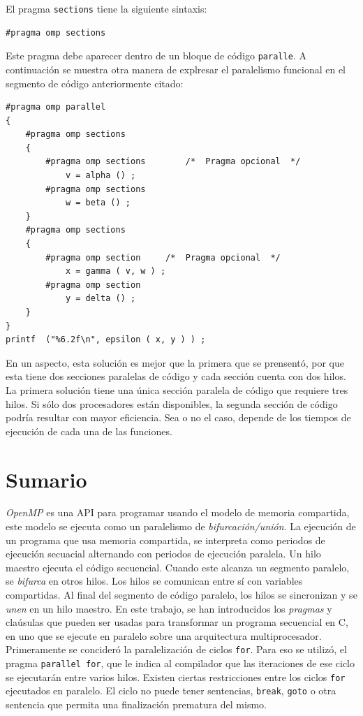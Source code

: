 \documentclass[12pt,letterpaper]{book}
\begin{document}
El pragma \texttt{sections} tiene la siguiente sintaxis:

\begin{lstlisting}[style=C]
#pragma omp sections
\end{lstlisting}

Este pragma debe aparecer dentro de un bloque de código \texttt{paralle}. A continuación se muestra otra manera de explresar el paralelismo funcional en el segmento de código anteriormente citado:

\begin{lstlisting}[style=C]
#pragma omp parallel
{
	#pragma omp sections
	{
		#pragma omp sections		/*  Pragma opcional  */
			v = alpha () ;
		#pragma omp sections
			w = beta () ;
	}
	#pragma omp sections
	{
		#pragma omp section		/*  Pragma opcional  */
			x = gamma ( v, w ) ;
		#pragma omp section
			y = delta () ;
	}
}
printf  ("%6.2f\n", epsilon ( x, y ) ) ;
\end{lstlisting}

En un aspecto, esta solución es mejor que la primera que se prensentó, por que esta tiene dos secciones paralelas de código y cada sección cuenta con dos hilos. La primera solución tiene una única sección paralela de código que requiere tres hilos. Si sólo dos procesadores están disponibles, la segunda sección de código podría resultar con mayor eficiencia. Sea o no el caso, depende de los tiempos de ejecución de cada una de las funciones.

\section{Sumario}

\textit{OpenMP} es una API para programar usando el modelo de memoria compartida, este modelo se ejecuta como un paralelismo de \textit{bifurcación/unión}. La ejecución de un programa que usa memoria compartida, se interpreta como periodos de ejecución secuacial alternando con periodos de ejecución paralela. Un hilo maestro ejecuta el código secuencial. Cuando este alcanza un segmento paralelo, se \textit{bifurca} en otros hilos. Los hilos se comunican entre sí con variables compartidas. Al final del segmento de código paralelo, los hilos se sincronizan y se \textit{unen} en un hilo maestro.
En este trabajo, se han introducidos los \textit{pragmas} y claúsulas que pueden ser usadas para transformar un programa secuencial en C, en uno que se ejecute en paralelo sobre una arquitectura multiprocesador. Primeramente se concideró la paralelización de ciclos \texttt{for}. Para eso se utilizó, el pragma \texttt{parallel for}, que le indica al compilador que las iteraciones de ese ciclo se ejecutarán entre varios hilos. Existen ciertas restricciones entre los ciclos \texttt{for} ejecutados en paralelo. El ciclo no puede tener sentencias, \texttt{break}, \texttt{goto} o otra sentencia que permita una finalización prematura del mismo.
\end{document}
